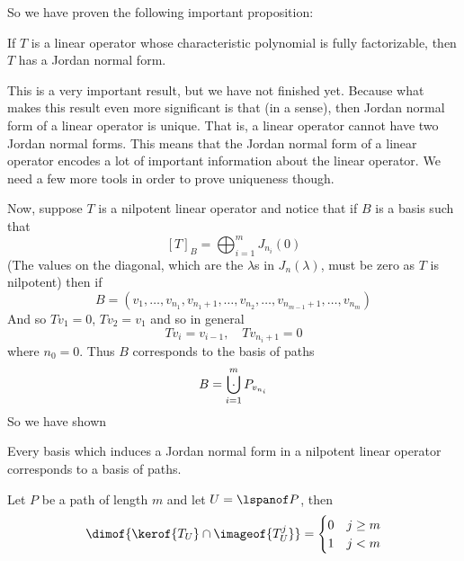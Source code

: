 So we have proven the following important proposition:

\begin{prop*}

    If $T$ is a linear operator whose characteristic polynomial is fully factorizable, then $T$ has a Jordan normal form.

\end{prop*}

This is a very important result, but we have not finished yet.
Because what makes this result even more significant is that (in a sense), then Jordan normal form of a linear operator is unique.
That is, a linear operator cannot have two Jordan normal forms.
This means that the Jordan normal form of a linear operator encodes a lot of important information about the linear operator.
We need a few more tools in order to prove uniqueness though.

Now, suppose $T$ is a nilpotent linear operator and notice that if $B$ is a basis such that
\[ [T]_B = \bigoplus_{i=1}^m J_{n_i}(0) \]
(The values on the diagonal, which are the $\lambda$s in $J_n(\lambda)$, must be zero as $T$ is nilpotent)
then if
\[ B = (v_1,\dots,v_{n_1},v_{n_1+1},\dots,v_{n_2},\dots,v_{n_{m-1}+1},\dots,v_{n_m}) \]
And so $Tv_1=0$, $Tv_2=v_1$ and so in general
\[ Tv_i = v_{i-1},\quad Tv_{n_i+1} = 0 \]
where $n_0=0$.
Thus $B$ corresponds to the basis of paths
\[ B = \bigdcup_{i=1}^m P_{v_{n_i}} \]
So we have shown

\begin{prop*}

    Every basis which induces a Jordan normal form in a nilpotent linear operator corresponds to a basis of paths.

\end{prop*}

\begin{lemm*}

    Let $P$ be a path of length $m$ and let $U=\lspanof P$, then
    \[ \dimof{\kerof{T_U}\cap\imageof{T_U^j}} = \begin{cases} 0 & j\geq m \\ 1 & j<m \end{cases} \]

\end{lemm*}

